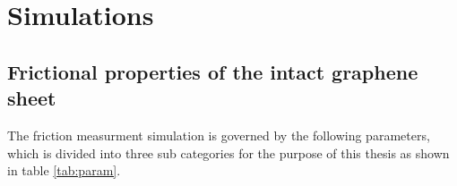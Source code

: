 \newpage
\chapter*{Simulations}




\section*{Frictional properties of the intact graphene sheet}
The friction measurment simulation is governed by the following parameters, which is divided into three sub categories for the purpose of this thesis as shown in table \ref{tab:param}.



